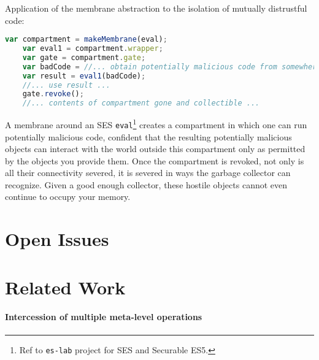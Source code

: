\documentclass{acm_proc_article-sp}
\begin{document}
Application of the membrane abstraction to the isolation of mutually distrustful code:

\begin{lstlisting}[language=javascript]
    var compartment = makeMembrane(eval);
    var eval1 = compartment.wrapper;
    var gate = compartment.gate;
    var badCode = //... obtain potentially malicious code from somewhere ...
    var result = eval1(badCode);
    //... use result ...
    gate.revoke();
    //... contents of compartment gone and collectible ...
\end{lstlisting}

A membrane around an SES \texttt{eval}\footnote{Ref to \texttt{es-lab} project for SES and Securable ES5.} creates a compartment in which one can run potentially malicious code, confident that the resulting potentially malicious objects can interact with the world outside this compartment only as permitted by the objects you provide them. Once the compartment is revoked, not only is all their connectivity severed, it is severed in ways the garbage collector can recognize. Given a good enough collector, these hostile objects cannot even continue to occupy your memory.

\section{Open Issues}

\section{Related Work}

\paragraph{Intercession of multiple meta-level operations}


\end{document}

